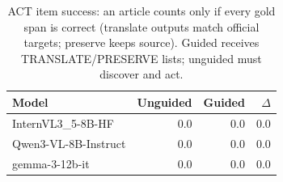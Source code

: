 \begin{table}[t]\centering\small
\caption{ACT item success: an article counts only if every gold span is correct (translate outputs match official targets; preserve keeps source). Guided receives TRANSLATE/PRESERVE lists; unguided must discover and act.}
\label{tab:news-act-item}
\begin{tabular}{l r r r}\toprule
Model & Unguided & Guided & $\Delta$ \\
\midrule
InternVL3_5-8B-HF & 0.0 & 0.0 & 0.0 \\
Qwen3-VL-8B-Instruct & 0.0 & 0.0 & 0.0 \\
gemma-3-12b-it & 0.0 & 0.0 & 0.0 \\
\bottomrule\end{tabular}\end{table}
